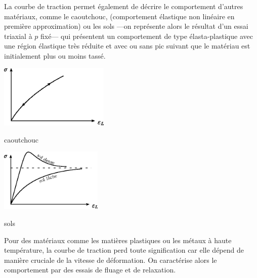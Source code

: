 La courbe de traction permet également de décrire le comportement d'autres matériaux, comme le caoutchouc, (comportement élastique non linéaire en première approximation) ou les sols ---on représente alors le résultat d'un essai triaxial à $p$ fixé--- qui présentent un comportement de type élasta-plastique avec une région élastique très réduite et avec ou sans pic suivant que le matériau est initialement plus ou moins tassé.
\begin{multicols}{2}
    \begin{center}
        \includegraphics[height=3cm]{../images/T1_Ch04-0015}

        caoutchouc
    \end{center}
    \columnbreak
    \begin{center}
        \includegraphics[height=3cm]{../images/T1_Ch04-0016}

        sols
    \end{center}
\end{multicols}

Pour des matériaux comme les matières plastiques ou les métaux à haute température, la courbe de traction perd toute signification car elle dépend de manière cruciale de la vitesse de déformation.
On caractérise alors le comportement par des essais de fluage et de relaxation.

